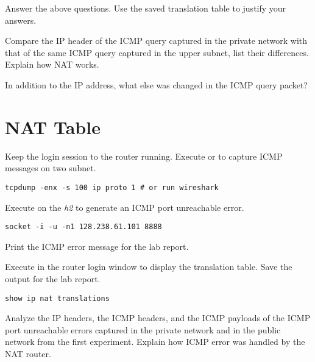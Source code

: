 \documentclass{../UTNetLab}
\begin{document}
\begin{report}
    \item Answer the above questions.
    Use the saved translation table to justify your answers.

    \item Compare the IP header of the ICMP query captured in the private network with that of the same ICMP query captured in the upper subnet, list their differences.
    Explain how NAT works.

    \item In addition to the IP address, what else was changed in the ICMP query packet?
\end{report}

\section{NAT Table}
Keep the login session to the router running.
Execute  or  to capture ICMP messages on two subnet.

\begin{lstlisting}
tcpdump -enx -s 100 ip proto 1 # or run wireshark
\end{lstlisting}

Execute  on the \textit{h2} to generate an ICMP port unreachable error.

\begin{lstlisting}
socket -i -u -n1 128.238.61.101 8888
\end{lstlisting}

Print the ICMP error message for the lab report.

Execute  in the router login window to display the translation table.
Save the output for the lab report.

\begin{lstlisting}[language=cisco, frame=trBL]
show ip nat translations
\end{lstlisting}

\begin{report}
    \item Analyze the IP headers, the ICMP headers, and the ICMP payloads of the ICMP port unreachable errors captured in the private network and in the public network from the first experiment.
    Explain how ICMP error was handled by the NAT router.
\end{report}
\end{document}
